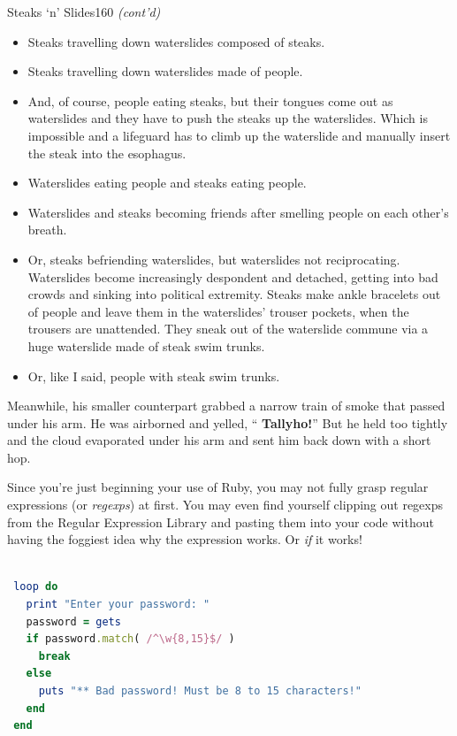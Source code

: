 \documentclass[10pt,twoside]{report}
\begin{document}
	\begin{sidebar}{Steaks `n' Slides}{160}
		\textit{(cont'd)}
		\begin{itemize}
			\item Steaks travelling down waterslides composed of steaks.
			\item Steaks travelling down waterslides made of people.
			\item And, of course, people eating steaks, but their tongues come out as waterslides and they have to push the steaks up the waterslides. Which is impossible and a lifeguard has to climb up the waterslide and manually insert the steak into the esophagus.
			\item Waterslides eating people and steaks eating people.
			\item Waterslides and steaks becoming friends after smelling people on each other's breath.
			\item Or, steaks befriending waterslides, but waterslides not reciprocating. Waterslides become increasingly despondent and detached, getting into bad crowds and sinking into political extremity. Steaks make ankle bracelets out of people and leave them in the waterslides' trouser pockets, when the trousers are unattended. They sneak out of the waterslide commune via a huge waterslide made of steak swim trunks.
			\item Or, like I said, people with steak swim trunks.
		\end{itemize}
	\end{sidebar}

Meanwhile, his smaller counterpart grabbed a narrow train of smoke
that passed under his arm.  He was airborned and yelled, ``{\bf
  Tallyho!}''  But he held too tightly and the cloud evaporated under
his arm and sent him back down with a short hop.

Since you're just beginning your use of Ruby, you may not fully grasp
regular expressions (or {\em regexps}) at first.  You may even find
yourself clipping out regexps from the Regular Expression Library and
pasting them into your code without having the foggiest idea why the
expression works.  Or {\em if} it works!


\begin{lstlisting}[basicstyle=\ttfamily\color{basiccolor},
    commentstyle = \ttfamily\color{commentcolor},
    keywordstyle=\ttfamily\color{keywordscolor},
    stringstyle=\color{stringcolor},
    language=Ruby,
    basicstyle=\small\ttfamily,
    showstringspaces=false,
  ]

 loop do
   print "Enter your password: "
   password = gets
   if password.match( /^\w{8,15}$/ )
     break
   else
     puts "** Bad password! Must be 8 to 15 characters!"
   end
 end

\end{lstlisting}
\end{document}
